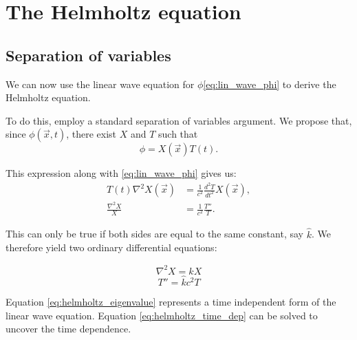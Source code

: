 \section{The Helmholtz equation}
\subsection{Separation of variables}\label{ss:ch1_sep_of_vars}
We can now use the linear wave equation for $\phi $\eqref{eq:lin_wave_phi} to derive the Helmholtz equation. \par
%
To do this, employ a standard separation of variables argument. We propose that, since $\phi(\vec{x}, t)$, there exist $X$ and $T$ such that
    \begin{equation}\label{eq:phi_separation}
        \phi = X(\vec{x})T(t).
    \end{equation}\par
%
This expression along with \eqref{eq:lin_wave_phi} gives us:
    \begin{align*}
        T(t) \nabla^2 X(\vec{x})  
        &= \frac{1}{c^2} \frac{d^2 T}{dt^2} X(\vec{x}), \\
        \frac{\nabla^2 X}{X} &= \frac{1}{c^2} \frac{T''}{T}.
    \end{align*}\par
%
This can only be true if both sides are equal to the same constant, say $\hat{k}$. We therefore yield two ordinary differential equations:
    \begin{multicols}{2}
    \noindent
        \begin{equation} \label{eq:helmholtz_eigenvalue}
            \nabla^2 X = \hat{k} X
        \end{equation}
        \begin{equation}\label{eq:helmholtz_time_dep}
            T'' = \hat{k}c^2 T
        \end{equation}
    \end{multicols}\par
%
Equation \eqref{eq:helmholtz_eigenvalue} represents a time independent form of the linear wave equation. Equation \eqref{eq:helmholtz_time_dep} can be solved to uncover the time dependence.\par
%
